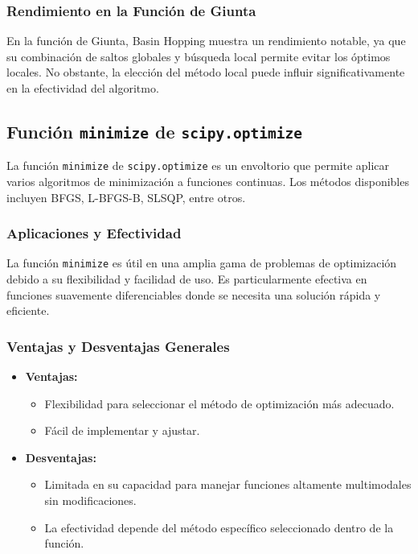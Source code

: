 \documentclass[fontsize=10pt]{article}
\begin{document}
\subsubsection{Rendimiento en la Función de Giunta}

En la función de Giunta, Basin Hopping muestra un rendimiento notable, ya que su combinación de saltos globales y búsqueda local permite evitar los óptimos locales. No obstante, la elección del método local puede influir significativamente en la efectividad del algoritmo.

\subsection{Función \texttt{minimize} de \texttt{scipy.optimize}}

La función \texttt{minimize} de \texttt{scipy.optimize} es un envoltorio que permite aplicar varios algoritmos de minimización a funciones continuas. Los métodos disponibles incluyen BFGS, L-BFGS-B, SLSQP, entre otros.

\subsubsection{Aplicaciones y Efectividad}

La función \texttt{minimize} es útil en una amplia gama de problemas de optimización debido a su flexibilidad y facilidad de uso. Es particularmente efectiva en funciones suavemente diferenciables donde se necesita una solución rápida y eficiente.

\subsubsection{Ventajas y Desventajas Generales}

\begin{itemize}
    \item \textbf{Ventajas:} 
    \begin{itemize}
        \item Flexibilidad para seleccionar el método de optimización más adecuado.
        \item Fácil de implementar y ajustar.
    \end{itemize}
    \item \textbf{Desventajas:} 
    \begin{itemize}
        \item Limitada en su capacidad para manejar funciones altamente multimodales sin modificaciones.
        \item La efectividad depende del método específico seleccionado dentro de la función.
    \end{itemize}
\end{itemize}
\end{document}
